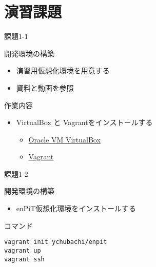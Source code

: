 \documentclass[t, aspectratio=169]{beamer}
\begin{document}
\section{演習課題}
\label{sec-1-5}
\begin{frame}[label=sec-1-5-1]{課題1-1}
\begin{block}{開発環境の構築}
\begin{itemize}
\item 演習用仮想化環境を用意する
\item 資料と動画を参照
\end{itemize}
\end{block}
\begin{block}{作業内容}
\begin{itemize}
\item VirtualBox と Vagrantをインストールする
\begin{itemize}
\item \href{https://www.virtualbox.org/}{Oracle VM VirtualBox}
\item \href{https://www.vagrantup.com/}{Vagrant}
\end{itemize}
\end{itemize}
\end{block}
\end{frame}
\begin{frame}[fragile,label=sec-1-5-2]{課題1-2}
 \begin{block}{開発環境の構築}
\begin{itemize}
\item enPiT仮想化環境をインストールする
\end{itemize}
\end{block}
\begin{block}{コマンド}
\begin{verbatim}
vagrant init ychubachi/enpit
vagrant up
vagrant ssh
\end{verbatim}
\end{block}
\end{frame}
\end{document}
